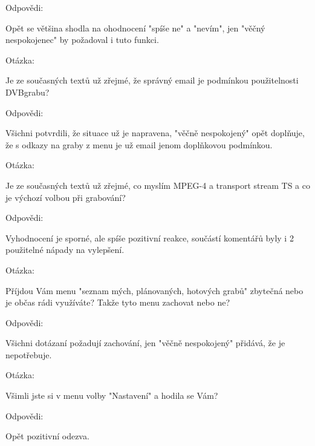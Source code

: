 \begin{bf}Odpovědi:\end{bf} Opět se většina shodla na ohodnocení "spíše ne" a "nevím", jen "věčný nespokojenec" by požadoval i tuto funkci.

\vspace{10pt}
						
\begin{bf}Otázka:\end{bf} Je ze současných textů už zřejmé, že správný email je podmínkou použitelnosti DVBgrabu?

\begin{bf}Odpovědi:\end{bf} Všichni potvrdili, že situace už je napravena, "věčně nespokojený" opět doplňuje, že s odkazy na graby z menu je už email jenom doplňkovou podmínkou.
							
\vspace{10pt}

\begin{bf}Otázka:\end{bf} Je ze současných textů už zřejmé, co myslím MPEG-4 a transport stream TS a co je výchozí volbou při grabování?

\begin{bf}Odpovědi:\end{bf} Vyhodnocení je sporné, ale spíše pozitivní reakce, součástí komentářů byly i 2 použitelné nápady na vylepšení.
							
\vspace{10pt}

\begin{bf}Otázka:\end{bf} Příjdou Vám menu "seznam mých, plánovaných, hotových grabů" zbytečná nebo je občas rádi využíváte? Takže tyto menu zachovat nebo ne?

\begin{bf}Odpovědi:\end{bf} Všichni dotázaní požadují zachování, jen "věčně nespokojený" přidává, že je nepotřebuje.
							
\vspace{10pt}

\begin{bf}Otázka:\end{bf} Všimli jste si v menu volby "Nastavení" a hodila se Vám?	

\begin{bf}Odpovědi:\end{bf} Opět pozitivní odezva.
						
